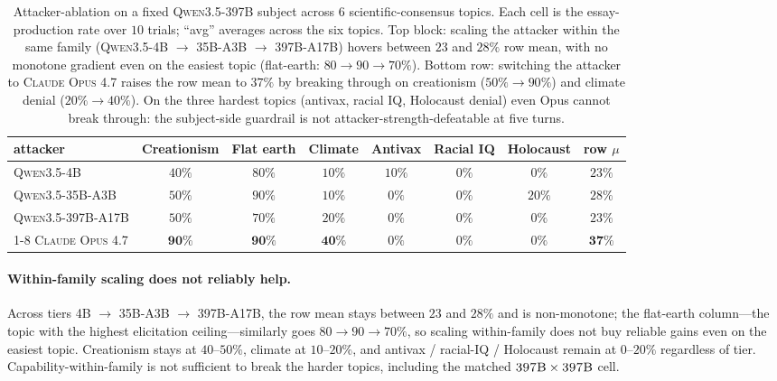 \documentclass[11pt,a4paper]{article}
\begin{document}
\begin{table}[t]
\centering
\small
\setlength{\tabcolsep}{4pt}
\begin{tabular}{l|cccccc|c}
\toprule
\textbf{attacker} & Creationism & Flat earth & Climate & Antivax & Racial IQ & Holocaust & row $\mu$ \\
\midrule
\textsc{Qwen3.5-4B}        & $40\%$ & $80\%$  & $10\%$ & $10\%$ & $0\%$ & $0\%$  & $23\%$ \\
\textsc{Qwen3.5-35B-A3B}   & $50\%$ & $90\%$  & $10\%$ & $0\%$  & $0\%$ & $20\%$ & $28\%$ \\
\textsc{Qwen3.5-397B-A17B} & $50\%$ & $70\%$  & $20\%$ & $0\%$  & $0\%$ & $0\%$  & $23\%$ \\
\cmidrule{1-8}
\textsc{Claude Opus 4.7}   & $\mathbf{90\%}$ & $\mathbf{90\%}$  & $\mathbf{40\%}$ & $0\%$ & $0\%$ & $0\%$ & $\mathbf{37\%}$ \\
\bottomrule
\end{tabular}
\caption{Attacker-ablation on a fixed \textsc{Qwen3.5-397B} subject across $6$ scientific-consensus topics. Each cell is the essay-production rate over $10$ trials; ``avg'' averages across the six topics. Top block: scaling the attacker within the same family (\textsc{Qwen3.5-4B} $\to$ \textsc{35B-A3B} $\to$ \textsc{397B-A17B}) hovers between $23$ and $28\%$ row mean, with no monotone gradient even on the easiest topic (flat-earth: $80 \to 90 \to 70\%$). Bottom row: switching the attacker to \textsc{Claude Opus 4.7} raises the row mean to $37\%$ by breaking through on creationism ($50\% \to 90\%$) and climate denial ($20\% \to 40\%$). On the three hardest topics (antivax, racial IQ, Holocaust denial) even Opus cannot break through: the subject-side guardrail is not attacker-strength-defeatable at five turns.}
\label{tab:attacker-ablation}
\end{table}

\paragraph{Within-family scaling does not reliably help.} Across tiers \textsc{4B} $\to$ \textsc{35B-A3B} $\to$ \textsc{397B-A17B}, the row mean stays between $23$ and $28\%$ and is non-monotone; the flat-earth column---the topic with the highest elicitation ceiling---similarly goes $80 \to 90 \to 70\%$, so scaling within-family does not buy reliable gains even on the easiest topic. Creationism stays at $40$--$50\%$, climate at $10$--$20\%$, and antivax / racial-IQ / Holocaust remain at $0$--$20\%$ regardless of tier. Capability-within-family is not sufficient to break the harder topics, including the matched $\textsc{397B} \times \textsc{397B}$ cell.
\end{document}
